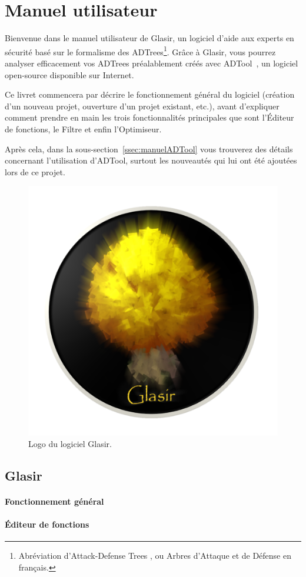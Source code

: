 \section{Manuel utilisateur}
\label{sec:manuel}

Bienvenue dans le manuel utilisateur de Glasir, un logiciel d'aide aux experts en sécurité basé sur le formalisme des ADTrees\footnote{Abréviation d'\og Attack-Defense Trees \fg{}, ou \og Arbres d'Attaque et de Défense\fg{} en français.}. Grâce à Glasir, vous pourrez analyser efficacement vos ADTrees préalablement créés avec ADTool~\cite{adtool}, un logiciel open-source disponible sur Internet.

Ce livret commencera par décrire le fonctionnement général du logiciel (création d'un nouveau projet, ouverture d'un projet existant, etc.), avant d'expliquer comment prendre en main les trois fonctionnalités principales que sont l'Éditeur de fonctions, le Filtre et enfin l'Optimiseur. 

Après cela, dans la {\sc sous-section}~\ref{ssec:manuelADTool} vous trouverez des détails concernant l'utilisation d'ADTool, surtout les nouveautés qui lui ont été ajoutées lors de ce projet.

\begin{figure}[!h]
        \centering
        \includegraphics[height=0.3\textwidth]{figure/glasir.png}
        \caption{Logo du logiciel Glasir.}
    \end{figure}

\subsection{Glasir}
\label{ssec:manuelGlasir}

\paragraph{Fonctionnement général}

\paragraph{Éditeur de fonctions}

